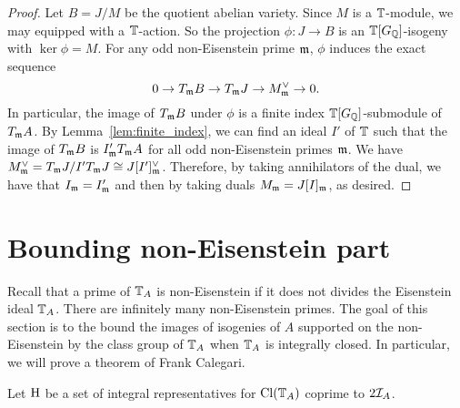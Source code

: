 \documentclass[thesis.tex]{subfiles}
\begin{document}
\begin{proof}
Let $B=J/M$ be the quotient abelian variety. Since $M$ is a $\mathbb{T}$-module,
we may equipped with a $\mathbb{T}$-action. So the projection $\phi:J \to B$ is an
$\mathbb{T}[G_{\mathbb{Q}}]$-isogeny with $\ker\phi = M$. For any odd non-Eisenstein prime
$\mathfrak{m}$, $\phi$ induces the exact sequence
\[
    0 \to T_{\mathfrak{m}} B \to T_{\mathfrak{m}} J \to M^\vee _{\mathfrak{m}} \to 0.
\]
In particular, the image of $T_{\mathfrak{m}} B$ under $\phi$ is a finite index
$\mathbb{T}[G_{\mathbb{Q}}]$-submodule of $T_{\mathfrak{m}} A$. By Lemma~\ref{lem:finite_index}, we can find
an ideal $I'$ of $\mathbb{T}$ such that the image of $T_{\mathfrak{m}} B$ is $I' _{\mathfrak{m}} T_{\mathfrak{m}} A$
for all odd non-Eisenstein primes $\mathfrak{m}$. We have $M^\vee _{\mathfrak{m}} = T_{\mathfrak{m}} J / I'
T_{\mathfrak{m}} J\cong J[I']_{\mathfrak{m}} ^\vee$. Therefore, by taking annihilators of the dual,
we have that $I_{\mathfrak{m}} = I'_{\mathfrak{m}}$ and then by taking duals $M_{\mathfrak{m}} = J[I]_{\mathfrak{m}}$, as
desired.
\end{proof}

\section{Bounding non-Eisenstein part}%
\label{sec:non_eisenstein_part}

Recall that a prime of $\mathbb{T}_A$ is non-Eisenstein if it does not divides the
Eisenstein ideal $\mathbb{T}_A$. There are infinitely many non-Eisenstein primes. The
goal of this section is to the bound the images of isogenies of $A$ supported
on the non-Eisenstein by the class group of $\mathbb{T}_A$ when $\mathbb{T}_A$ is integrally
closed. In particular, we will prove a theorem of Frank Calegari.

Let $\operatorname{H}$ be a set of integral representatives for $\operatorname{Cl}(\mathbb{T}_A)$ coprime to
$2\mathcal{I}_A$.
\end{document}
